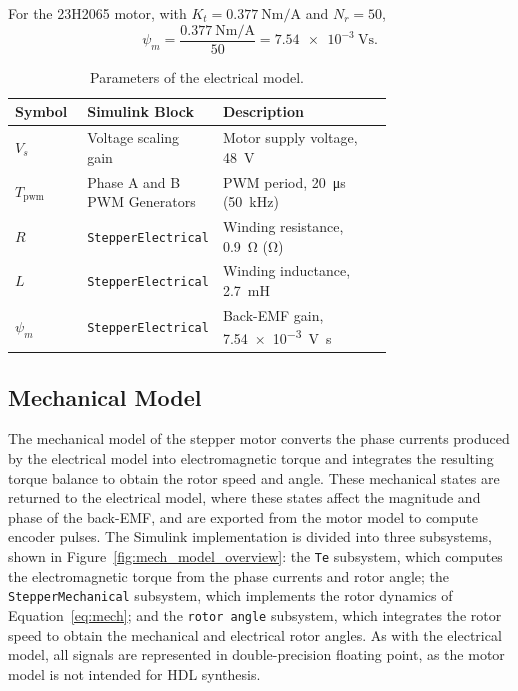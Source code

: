 For the 23H2065 motor, with $K_t = \SI{0.377}{\newton\meter\per\ampere}$ and
$N_r = 50$,
\begin{equation}
	\psi_m = \frac{\SI{0.377}{\newton\meter\per\ampere}}{50}
	= \SI{7.54e-3}{\volt\second}.
\end{equation}


\begin{table}[htbp]
	\centering
	\caption{Parameters of the electrical model.}
	\vspace{4pt}
	\label{tab:elec_params}
	\begin{tabular}{l>{\raggedright\arraybackslash}p{0.3\linewidth}>{\raggedright\arraybackslash}p{0.45\linewidth}}
		\hline
		Symbol & Simulink Block & Description \\
		\hline
		$V_s$              & Voltage scaling gain             & Motor supply voltage, \SI{48}{\volt} \\
		$T_{\mathrm{pwm}}$ & Phase A and B PWM Generators     & PWM period, \SI{20}{\micro\second} (\SI{50}{\kilo\hertz}) \\
		$R$                & \texttt{StepperElectrical}       & Winding resistance, \SI{0.9}{\ohm} (\si{\ohm}) \\ 
		$L$                & \texttt{StepperElectrical}       & Winding inductance, \SI{2.7}{\milli\henry} \\
		$\psi_m$         & \texttt{StepperElectrical}       & Back-EMF gain, \SI{7.54e-3}{\volt\second} \\
		\hline
	\end{tabular}
\end{table}


\subsection{Mechanical Model}\label{stepperMotorMechanicalModel}


The mechanical model of the stepper motor converts the phase currents
produced by the electrical model into electromagnetic torque and integrates the resulting torque balance to obtain the rotor speed and angle. These mechanical states are returned to the electrical model, where these states affect the magnitude and phase of the back-EMF, and are exported from the motor model to compute encoder pulses. The Simulink implementation is divided into three subsystems, shown in Figure~\ref{fig:mech_model_overview}: %
the \texttt{Te} subsystem, which computes the electromagnetic torque from the phase currents and rotor angle; the \texttt{StepperMechanical} subsystem, which implements the rotor dynamics of Equation~\eqref{eq:mech}; and the \texttt{rotor angle} subsystem, which integrates the rotor speed to obtain the mechanical and electrical rotor angles. As with the electrical model, all signals are represented in double-precision floating point, as the motor model is not intended for HDL synthesis.

